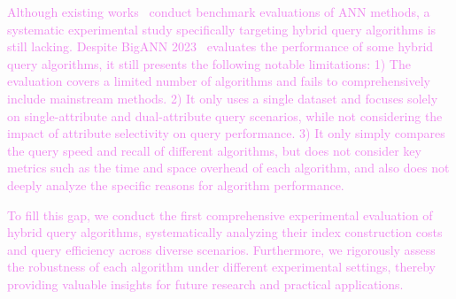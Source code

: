 \documentclass[sigconf, nonacm]{acmart}
\begin{document}
	\textcolor{violet}{Although existing works~\cite{compare,azizi2025graph} conduct benchmark evaluations of ANN methods, a systematic experimental study specifically targeting hybrid query algorithms is still lacking. Despite BigANN 2023~\cite{bigann2023} evaluates the performance of some hybrid query algorithms, it still presents the following notable limitations:
	1) The evaluation covers a limited number of algorithms and fails to comprehensively include mainstream methods.
	2) It only uses a single dataset and focuses solely on single-attribute and dual-attribute query scenarios, while not considering the impact of attribute selectivity on query performance.
	3) It only simply compares the query speed and recall of different algorithms, but does not consider key metrics such as the time and space overhead of each algorithm, and also does not deeply analyze the specific reasons for algorithm performance.}
	
	\textcolor{violet}{To fill this gap, we conduct the first comprehensive experimental evaluation of hybrid query algorithms, systematically analyzing their index construction costs and query efficiency across diverse scenarios. Furthermore, we rigorously assess the robustness of each algorithm under different experimental settings, thereby providing valuable insights for future research and practical applications.}
	
\end{document}
